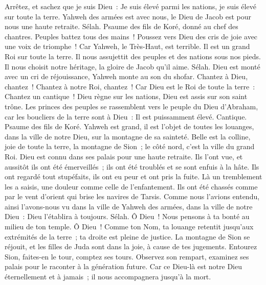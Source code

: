 \begin{multicols}{2}
Arrêtez, et sachez que je suis Dieu~: Je suis élevé parmi les nations, je suis élevé sur toute la terre.
Yahweh des armées est avec nous, le Dieu de Jacob est pour nous une haute retraite. Sélah.
\VerseOne{}Psaume des fils de Koré, donné au chef des chantres.
Peuples battez tous des mains~! Poussez vers Dieu des cris de joie avec une voix de triomphe~!
Car Yahweh, le Très-Haut, est terrible. Il est un grand Roi sur toute la terre.
Il nous assujettit des peuples et des nations sous nos pieds.
Il nous choisit notre héritage, la gloire de Jacob qu'il aime. Sélah.
Dieu est monté avec un cri de réjouissance, Yahweh monte au son du shofar.
Chantez à Dieu, chantez~! Chantez à notre Roi, chantez~!
Car Dieu est le Roi de toute la terre~: Chantez un cantique~!
Dieu règne sur les nations, Dieu est assis sur son saint trône.
Les princes des peuples se rassemblent vers le peuple du Dieu d'Abraham, car les boucliers de la terre sont à Dieu~: Il est puissamment élevé.
\VerseOne{}Cantique. Psaume des fils de Koré.
Yahweh est grand, il est l'objet de toutes les louanges, dans la ville de notre Dieu, sur la montagne de sa sainteté.
Belle est la colline, joie de toute la terre, la montagne de Sion~; le côté nord, c'est la ville du grand Roi.
Dieu est connu dans ses palais pour une haute retraite.
Ils l'ont vue, et aussitôt ils ont été émerveillés~; ils ont été troublés et se sont enfuis à la hâte.
Ils ont regardé tout stupéfaits, ils ont eu peur et ont pris la fuite.
Là un tremblement les a saisis, une douleur comme celle de l'enfantement.
Ils ont été chassés comme par le vent d'orient qui brise les navires de Tarsis.
Comme nous l'avions entendu, ainsi l'avons-nous vu dans la ville de Yahweh des armées, dans la ville de notre Dieu~: Dieu l'établira à toujours. Sélah.
Ô Dieu~! Nous pensons à ta bonté au milieu de ton temple.
Ô Dieu~! Comme ton Nom, ta louange retentit jusqu'aux extrémités de la terre~; ta droite est pleine de justice.
La montagne de Sion se réjouit, et les filles de Juda sont dans la joie, à cause de tes jugements.
Entourez Sion, faites-en le tour, comptez ses tours.
Observez son rempart, examinez ses palais pour le raconter à la génération future.
Car ce Dieu-là est notre Dieu éternellement et à jamais~; il nous accompagnera jusqu'à la mort.

\end{multicols}
